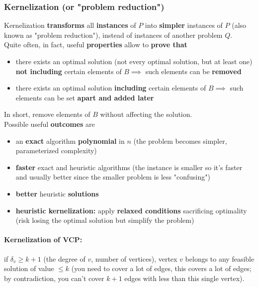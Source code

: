 \documentclass[11pt]{article}
\begin{document}
	\newpage
	
	\subsubsection{Kernelization (or "problem reduction")}
	Kernelization \textbf{transforms} all \textbf{instances} of $P$ into \textbf{simpler} instances of $P$ (also known as "problem reduction"), instead of instances of another problem $Q$.\\
	
	Quite often, in fact, useful \textbf{properties} allow to \textbf{prove that}
	\begin{itemize}
		\item there exists an optimal solution (not every optimal solution, but at least one) \textbf{not including} certain elements of $B \implies$ such elements can be \textbf{removed}
		\item there exists an optimal solution \textbf{including} certain elements of $B \implies$ such elements can be set \textbf{apart and added later}
	\end{itemize}
	In short, remove elements of $B$ without affecting the solution.\\
	
	Possible useful \textbf{outcomes} are
	\begin{itemize}
		\item an \textbf{exact} algorithm \textbf{polynomial} in $n$ (the problem becomes simpler, parameterized complexity)
		\item \textbf{faster} exact and heuristic algorithms (the instance is smaller so it's faster and usually better since the smaller problem is less "confusing")
		\item \textbf{better} heuristic \textbf{solutions}
		\item \textbf{heuristic kernelization:} apply \textbf{relaxed conditions} sacrificing optimality (risk losing the optimal solution but simplify the problem)
	\end{itemize}
	
	\newpage
	
	\paragraph{Kernelization of VCP:} if $\delta_v \geq k+1$ (the degree of $v$, number of vertices), vertex $v$ belongs to any feasible solution of value $\leq k$ (you need to cover a lot of edges, this covers a lot of edges; by contradiction, you can't cover $k+1$ edges with less than this single vertex).\\
	
\end{document}
